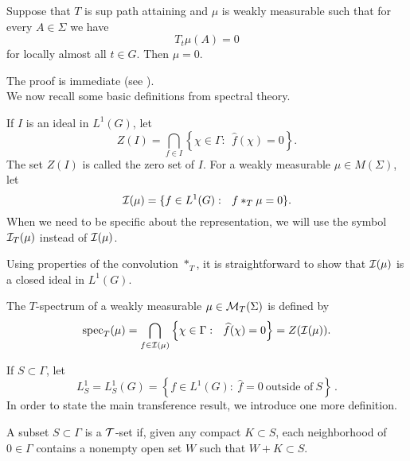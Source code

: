\documentclass[12pt,leqno]{article}
\def\cT{{\cal T}}
\def\cI{{\cal I}}
\def\cMT{{\cal M}_T(\Sigma)}
\begin{document}
\begin{prop}
Suppose that $T$ is sup path attaining 
and $\mu$ is weakly measurable such that for 
every $A\in \Sigma$ we have
$$T_t\mu(A)=0$$
for locally almost all $t\in G$.  Then $\mu=0$.
\label{prop hypa}
\end{prop}
The proof is immediate (see \cite{ams2}).\\





  
We now 
recall some basic definitions from spectral theory.

 
If $I$ is an ideal in $L^1(G)$, let
$$Z(I)=\bigcap_{f\in I}
\left\{
\chi\in\Gamma:\ \ \widehat{f}(\chi)=0
\right\}.$$
The set $Z(I)$ is called the zero set of $I$.
For a weakly measurable $\mu\in M(\Sigma)$, let
$$\cI (\mu)=\{f\in L^1(G):\ \ f*_T\mu =0\}.$$
When we need to be specific about the 
representation, we will use 
the symbol $\cI_T (\mu)$ instead of $\cI (\mu)$.

Using properties of the convolution $*_T$,
it is straightforward to show that $\cI(\mu)$ is a closed ideal
in $L^1(G)$.
\begin{defin}
The $T$-spectrum of a 
weakly measurable $\mu\in \cMT$ is defined by 
\begin{equation}
{\rm spec}_T (\mu)= \bigcap_{f\in \cI(\mu)}
\left\{
\chi\in\Gamma:\ \ \widehat{f}(\chi)=0
\right\}=Z(\cI(\mu)).
\label{specsbt}
\end{equation}
\label{Tspectrum}
\end{defin}
If $S\subset \Gamma$, let
$$L_S^1=L_S^1(G)=\left\{f\in L^1(G):\ \widehat{f}=0\ \mbox{outside of}\ S\right\}\,.$$
In order to state the main transference result, we introduce one more definition.

\begin{defin}
A subset $S\subset\Gamma$ is a $\cT$-set if, given any compact 
$K\subset S$, each neighborhood of $0\in\Gamma$ contains a nonempty open set
$W$ such that $W+K\subset S$. 
\label{t-set}
\end{defin}
\end{document}

